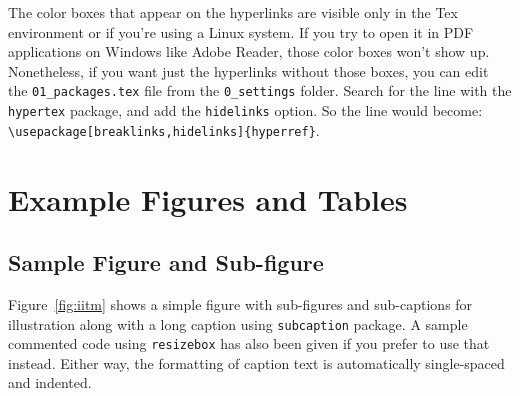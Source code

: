 The color boxes that appear on the hyperlinks are visible only in the Tex environment or if you're using a Linux system. If you try to open it in PDF applications on Windows like Adobe Reader, those color boxes won't show up. Nonetheless, if you want just the hyperlinks without those boxes, you can edit the \verb+01_packages.tex+ file from the \verb+0_settings+ folder. Search for the line with the \verb+hypertex+ package, and add the \verb+hidelinks+ option. So the line would become: \verb+\usepackage[breaklinks,hidelinks]{hyperref}+.

\section{Example Figures and Tables}

\subsection{Sample Figure and Sub-figure}
Figure~\ref{fig:iitm} shows a simple figure with sub-figures and sub-captions for illustration along with a long caption using \verb+subcaption+ package.  A sample commented code using \verb|resizebox| has also been given if you prefer to use that instead. Either way, the formatting of caption text is automatically single-spaced and indented.


